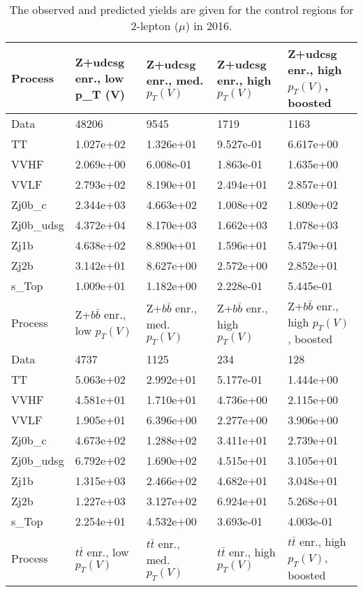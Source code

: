\begin{table}
\centering
\caption[2016 2-lepton ($\mu$) control region yields]{
                  The observed and predicted yields are given for the
                  control regions for 2-lepton ($\mu$) in 2016.
                  }
{\footnotesize
\begin{tabularx}{\textwidth}{|X|X|X|X|X|}
\hline
Process & Z+udcsg enr., low p_{T} (V) & Z+udcsg enr., med. $p_{T}(V)$ & Z+udcsg enr., high $p_{T}(V)$ & Z+udcsg enr., high $p_{T}(V)$, boosted \\
\hline
Data & 48206 & 9545 & 1719 & 1163 \\
\hline
TT & 1.027e+02 & 1.326e+01 & 9.527e-01 & 6.617e+00 \\
VVHF & 2.069e+00 & 6.008e-01 & 1.863e-01 & 1.635e+00 \\
VVLF & 2.793e+02 & 8.190e+01 & 2.494e+01 & 2.857e+01 \\
Zj0b\_c & 2.344e+03 & 4.663e+02 & 1.008e+02 & 1.809e+02 \\
Zj0b\_udsg & 4.372e+04 & 8.170e+03 & 1.662e+03 & 1.078e+03 \\
Zj1b & 4.638e+02 & 8.890e+01 & 1.596e+01 & 5.479e+01 \\
Zj2b & 3.142e+01 & 8.627e+00 & 2.572e+00 & 2.852e+01 \\
s\_Top & 1.009e+01 & 1.182e+00 & 2.228e-01 & 5.445e-01 \\
\hline
\hline
Process & Z+$b\bar{b}$ enr., low $p_{T}(V)$ & Z+$b\bar{b}$ enr., med. $p_{T}(V)$ & Z+$b\bar{b}$ enr., high $p_{T}(V)$ & Z+$b\bar{b}$ enr., high $p_{T}(V)$, boosted \\
\hline
Data & 4737 & 1125 & 234 & 128 \\
\hline
TT & 5.063e+02 & 2.992e+01 & 5.177e-01 & 1.444e+00 \\
VVHF & 4.581e+01 & 1.710e+01 & 4.736e+00 & 2.115e+00 \\
VVLF & 1.905e+01 & 6.396e+00 & 2.277e+00 & 3.906e+00 \\
Zj0b\_c & 4.673e+02 & 1.288e+02 & 3.411e+01 & 2.739e+01 \\
Zj0b\_udsg & 6.792e+02 & 1.690e+02 & 4.515e+01 & 3.105e+01 \\
Zj1b & 1.315e+03 & 2.466e+02 & 4.682e+01 & 3.048e+01 \\
Zj2b & 1.227e+03 & 3.127e+02 & 6.924e+01 & 5.268e+01 \\
s\_Top & 2.254e+01 & 4.532e+00 & 3.693e-01 & 4.003e-01 \\
\hline
\hline
Process & $t\bar{t}$ enr., low $p_{T}(V)$ & $t\bar{t}$ enr., med. $p_{T}(V)$ & $t\bar{t}$ enr., high $p_{T}(V)$ & $t\bar{t}$ enr., high $p_{T}(V)$, boosted \\

\end{tabularx}}
\end{table}
